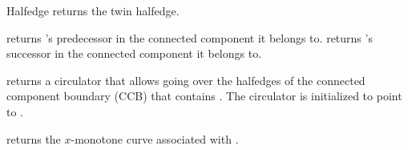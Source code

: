\begin{ccRefClass}{Halfedge}
    {returns the twin halfedge.}

    {returns \ccVar{}'s predecessor in the connected component it belongs to.}
\ccGlue
{}
    {returns \ccVar{}'s successor in the connected component it belongs to.}

    {returns a circulator that allows going over the halfedges of the
     connected component boundary (CCB) that contains \ccVar{}.
     The circulator is initialized to point to \ccVar{}.}

    {returns the $x$-monotone curve associated with \ccVar{}.}

\end{ccRefClass}

\ccRefPageEnd
